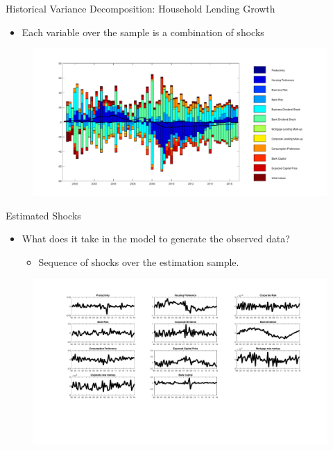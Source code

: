 \documentclass[8pt,aspectratio=169]{beamer}
\numberwithin{equation}{section}
\begin{document}
\begin{frame}{Historical Variance Decomposition: Household Lending Growth }
\begin{itemize}

\item Each variable over the sample is a combination of shocks
\end{itemize}

\begin{figure}
\includegraphics[scale=0.36]{decomp_dbm.pdf}
\end{figure}
\end{frame}





\begin{frame}{Estimated Shocks}

\begin{itemize}
\item What does it take in the model to generate the observed data? 

\begin{itemize}
\item Sequence of shocks over the estimation sample. 
\end{itemize}

\end{itemize}

\begin{figure}
\includegraphics[scale=0.25]{smoothed_shocks.pdf}
\end{figure}
\end{frame}
\end{document}
